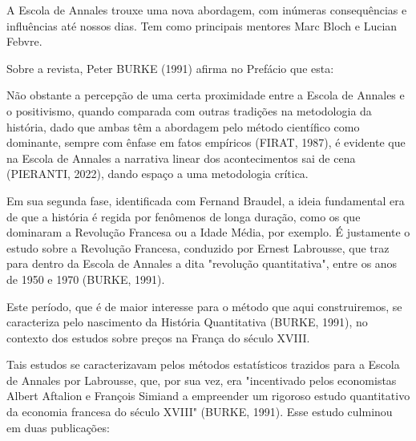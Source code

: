 A Escola de Annales trouxe uma nova abordagem, com inúmeras consequências e influências até nossos dias. Tem como principais mentores  Marc Bloch e Lucian Febvre.

Sobre a revista, Peter BURKE (1991) afirma no Prefácio que esta:


\noindent\begin{flushright}\mbox{\linespread{1}\selectfont\centering{}}\end{flushright}


Não obstante a percepção de uma certa proximidade entre a Escola de Annales e o positivismo, quando comparada com outras tradições na metodologia da história, dado que ambas têm a abordagem pelo método científico como dominante, sempre com ênfase em fatos empíricos (FIRAT, 1987), é evidente que na Escola de Annales a narrativa linear dos acontecimentos sai de cena (PIERANTI, 2022), dando espaço a uma metodologia crítica.

Em sua segunda fase, identificada com Fernand Braudel, a ideia fundamental era de que a história é regida por fenômenos de longa duração, como os que dominaram a Revolução Francesa ou a Idade Média, por exemplo. É justamente o estudo sobre a Revolução Francesa, conduzido por Ernest Labrousse, que traz para dentro da Escola de Annales a dita "revolução quantitativa", entre os anos de 1950 e 1970  (BURKE, 1991).

Este período, que é de maior interesse para o método que aqui construiremos, se caracteriza pelo nascimento da História Quantitativa (BURKE, 1991), no contexto dos estudos sobre preços na França do século XVIII.

Tais estudos se caracterizavam pelos métodos estatísticos trazidos para a Escola de Annales por Labrousse, que, por sua vez, era "incentivado pelos economistas Albert Aftalion e François Simiand a empreender um rigoroso estudo quantitativo da economia francesa do século XVIII"  (BURKE, 1991). Esse estudo culminou em duas publicações:


